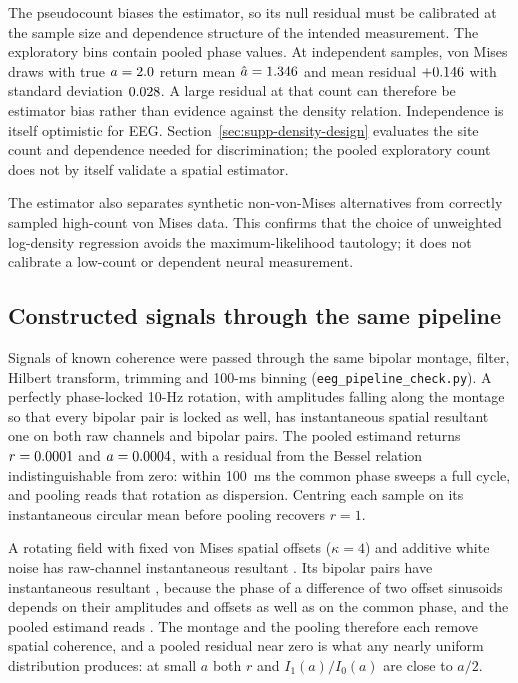 \documentclass{article}
\begin{document}
The pseudocount biases the estimator, so its null residual must be calibrated at the sample size and dependence structure of the intended measurement. The exploratory bins contain \eegPooledSamples{} pooled phase values. At \eegCalibrationSmallSamples{} independent samples, \eegCalibrationReplicas{} von Mises draws with true $a=2.0$ return mean $\hat a=1.346$ and mean residual $+0.146$ with standard deviation $0.028$. A large residual at that count can therefore be estimator bias rather than evidence against the density relation. Independence is itself optimistic for EEG. Section~\ref{sec:supp-density-design} evaluates the site count and dependence needed for discrimination; the pooled exploratory count does not by itself validate a spatial estimator.

The estimator also separates synthetic non-von-Mises alternatives from correctly sampled high-count von Mises data. This confirms that the choice of unweighted log-density regression avoids the maximum-likelihood tautology; it does not calibrate a low-count or dependent neural measurement.

\subsection{Constructed signals through the same pipeline}
\label{sec:supp-eeg-check}

Signals of known coherence were passed through the same bipolar montage, filter, Hilbert transform, trimming and 100-ms binning (\nolinkurl{eeg_pipeline_check.py}). A perfectly phase-locked 10-Hz rotation, with amplitudes falling along the montage so that every bipolar pair is locked as well, has instantaneous spatial resultant one on both raw channels and bipolar pairs. The pooled estimand returns $r=0.0001$ and $a=0.0004$, with a residual from the Bessel relation indistinguishable from zero: within 100~ms the common phase sweeps a full cycle, and pooling reads that rotation as dispersion. Centring each sample on its instantaneous circular mean before pooling recovers $r=1$.

A rotating field with fixed von Mises spatial offsets ($\kappa=4$) and additive white noise has raw-channel instantaneous resultant \eegCheckFieldRawR. Its bipolar pairs have instantaneous resultant \eegCheckFieldBipolarR, because the phase of a difference of two offset sinusoids depends on their amplitudes and offsets as well as on the common phase, and the pooled estimand reads \eegCheckFieldPooledR. The montage and the pooling therefore each remove spatial coherence, and a pooled residual near zero is what any nearly uniform distribution produces: at small $a$ both $r$ and $I_1(a)/I_0(a)$ are close to $a/2$.
\end{document}
